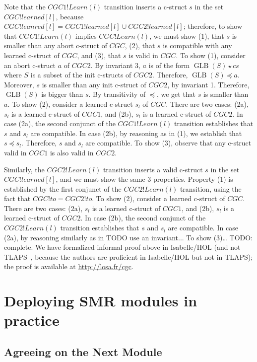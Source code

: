 Note that the $CGC1!Learn(l)$ transition inserts a c-struct $s$ in the set $CGC!learned\left[ l \right]$, because $CGC!leanred[l] = CGC1!learned\left[ l \right] \cup CGC2!learned\left[ l \right]$; therefore, to show that $CGC1!Learn\left( l \right)$ implies $CGC!Learn\left( l \right)$, we must show (1), that $s$ is smaller than any abort c-struct of $CGC$, (2), that $s$ is compatible with any learned c-struct of $CGC$, and (3), that $s$ is valid in $CGC$. 
To show (1), consider an abort c-struct $a$ of $CGC2$. By invariant 3, $a$ is of the form $\operatorname{GLB}\left( S \right)\star cs$ where $S$ is a subset of the init c-structs of $CGC2$. Therefore, $\operatorname{GLB}\left( S \right)\preceq a$. Moreover, $s$ is smaller than any init c-struct of $CGC2$, by invariant 1. Therefore, $\operatorname{GLB}\left( S \right)$ is bigger than $s$. By transitivity of $\preceq$, we get that $s$ is smaller than $a$.
To show (2), consider a learned c-struct $s_l$ of $CGC$. There are two cases: (2a), $s_l$ is a learned c-struct of $CGC1$, and (2b), $s_l$ is a learned c-struct of $CGC2$. In case (2a), the second conjunct of the $CGC1!Learn(l)$ transition establishes that $s$ and $s_l$ are compatible. In case (2b), by reasoning as in (1), we establish that $s \preceq s_l$. Therefore, $s$ and $s_l$ are compatible.
To show (3), observe that any c-struct valid in $CGC1$ is also valid in $CGC2$.

Similarly, the $CGC2!Learn(l)$ transition inserts a valid c-struct $s$ in the set $CGC!learned\left[ l \right]$, and we must show the same 3 properties.
Property (1) is established by the first conjunct of the $CGC2!Learn\left( l \right)$ transition, using the fact that $CGC!to = CGC2!to$.
To show (2), consider a learned c-struct of $CGC$.
There are two cases: (2a), $s_l$ is a learned c-struct of $CGC1$, and (2b), $s_l$ is a learned c-struct of $CGC2$. In case (2b), the second conjunct of the $CGC2!Learn(l)$ transition establishes that $s$ and $s_l$ are compatible. In case (2a), by reasoning similarly as in TODO use an invariant...
To show (3)\ldots
TODO\@: complete.
We have formalized informal proof above in Isabelle/HOL (and not TLAPS~\cite{CousineauETAL12TlaProofs}, because the authors are proficient in Isabelle/HOL but not in TLAPS); the proof is available at \url{http://losa.fr/cgc}.


\section{Deploying SMR modules in practice}

\subsection{Agreeing on the Next Module}
